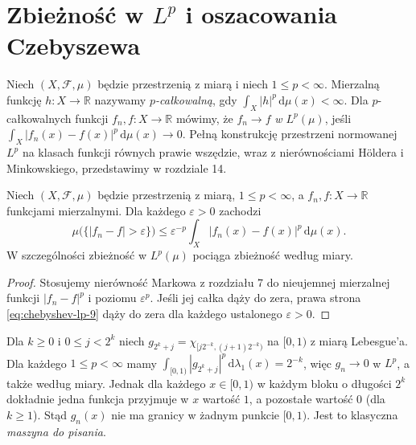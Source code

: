 \section{Zbieżność w \texorpdfstring{$L^p$}{L\string^p} i oszacowania Czebyszewa}

\begin{definicja}
\label{def:lp-convergence-9}
Niech $(X,\mathcal F,\mu)$ będzie przestrzenią z miarą
i niech $1\le p<\infty$. Mierzalną funkcję
$h:X\to\mathbb R$ nazywamy \emph{$p$-całkowalną},
gdy $\int_X|h|^p\,\mathrm d\mu(x)<\infty$.
Dla $p$-całkowalnych funkcji $f_n,f:X\to\mathbb R$
mówimy, że $f_n\to f$ \emph{w $L^p(\mu)$}, jeśli
$\int_X|f_n(x)-f(x)|^p\,\mathrm d\mu(x)\to0$.
Pełną konstrukcję przestrzeni normowanej $L^p$
na klasach funkcji równych prawie wszędzie,
wraz z nierównościami H\"oldera i Minkowskiego,
przedstawimy w rozdziale 14.
\end{definicja}

\begin{twierdzenie}
\label{thm:lp-implies-measure-9}
Niech $(X,\mathcal F,\mu)$ będzie przestrzenią z miarą,
$1\le p<\infty$, a $f_n,f:X\to\mathbb R$
funkcjami mierzalnymi. Dla każdego $\varepsilon>0$ zachodzi
\begin{equation}\label{eq:chebyshev-lp-9}
\mu\bigl(\{|f_n-f|>\varepsilon\}\bigr)
\le\varepsilon^{-p}
\int_X|f_n(x)-f(x)|^p\,\mathrm d\mu(x).
\end{equation}
W szczególności zbieżność w $L^p(\mu)$ pociąga
zbieżność według miary.
\end{twierdzenie}
\begin{proof}
Stosujemy nierówność Markowa z rozdziału 7
do nieujemnej mierzalnej funkcji $|f_n-f|^p$
i poziomu $\varepsilon^p$. Jeśli jej całka dąży
do zera, prawa strona \eqref{eq:chebyshev-lp-9}
dąży do zera dla każdego ustalonego $\varepsilon>0$.
\end{proof}

\begin{przyklad}
\label{ex:typewriter-lp-9}
Dla $k\ge0$ i $0\le j<2^k$ niech
$g_{2^k+j}=\chi_{[j2^{-k},(j+1)2^{-k})}$
na $[0,1)$ z miarą Lebesgue'a. Dla każdego
$1\le p<\infty$ mamy
$\int_{[0,1)}|g_{2^k+j}|^p\,\mathrm d\lambda_1(x)=2^{-k}$,
więc $g_n\to0$ w $L^p$, a także według miary.
Jednak dla każdego $x\in[0,1)$ w każdym bloku o długości
$2^k$ dokładnie jedna funkcja przyjmuje w $x$
wartość $1$, a pozostałe wartość $0$ (dla $k\ge1$).
Stąd $g_n(x)$ nie ma granicy w żadnym punkcie $[0,1)$.
Jest to klasyczna \emph{maszyna do pisania}.
\end{przyklad}

